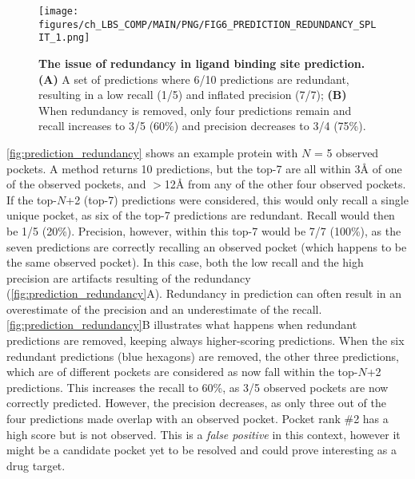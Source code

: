 \begin{figure}[htb!]
    \centering
    \texttt{[image: figures/ch\_LBS\_COMP/MAIN/PNG/FIG6\_PREDICTION\_REDUNDANCY\_SPLIT\_1.png]}
    \caption[The issue of redundancy in ligand binding site prediction]{\textbf{The issue of redundancy in ligand binding site prediction.} \textbf{(A)} A set of predictions where 6/10 predictions are redundant, resulting in a low recall (1/5) and inflated precision (7/7); \textbf{(B)} When redundancy is removed, only four predictions remain and recall increases to 3/5 (60\%) and precision decreases to 3/4 (75\%).}
    \label{fig:prediction_redundancy}
\end{figure}

\FloatBarrier

\autoref{fig:prediction_redundancy} shows an example protein with $N$ = 5 observed pockets. A method returns 10 predictions, but the top-7 are all within 3\AA{} of one of the observed pockets, and $>$12\AA{} from any of the other four observed pockets. If the top-$N$+2 (top-7) predictions were considered, this would only recall a single unique pocket, as six of the top-7 predictions are redundant. Recall would then be 1/5 (20\%). Precision, however, within this top-7 would be 7/7 (100\%), as the seven predictions are correctly recalling an observed pocket (which happens to be the same observed pocket). In this case, both the low recall and the high precision are artifacts resulting of the redundancy (\autoref{fig:prediction_redundancy}A). Redundancy in prediction can often result in an overestimate of the precision and an underestimate of the recall. \autoref{fig:prediction_redundancy}B illustrates what happens when redundant predictions are removed, keeping always higher-scoring predictions. When the six redundant predictions (blue hexagons) are removed, the other three predictions, which are of different pockets are considered as now fall within the top-$N$+2 predictions. This increases the recall to 60\%, as 3/5 observed pockets are now correctly predicted. However, the precision decreases, as only three out of the four predictions made overlap with an observed pocket. Pocket rank \#2 has a high score but is not observed. This is a \textit{false positive} in this context, however it might be a candidate pocket yet to be resolved and could prove interesting as a drug target.

